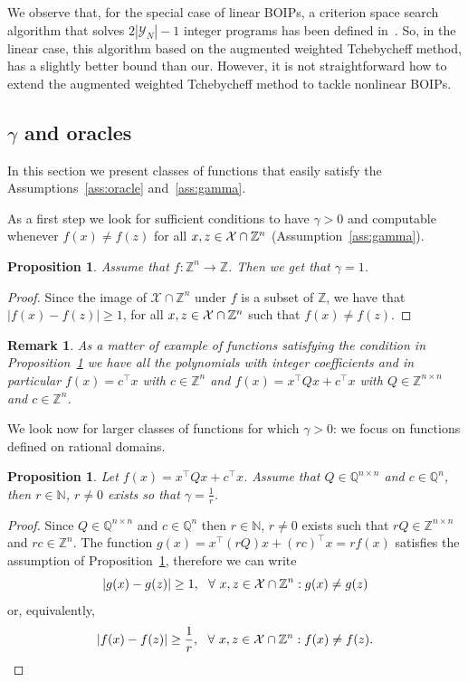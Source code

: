 \documentclass[preprint,12pt]{elsarticle}
\newtheorem{proposition}[theorem]{Proposition}
\newtheorem{remark}[theorem]{Remark}
\def\X{{\cal X}}
\def\Q{\mathbb{Q}}
\def\Z{\mathbb{Z}}
\def\N{\mathbb{N}}
\begin{document}
We observe that, for the special case of linear BOIPs, a criterion space search algorithm
that solves $2|\mathcal{Y}_N|-1$ integer programs has been defined in~\cite{ralphs2006improved}.
So, in the linear case, this algorithm based on the augmented weighted Tchebycheff method, has a slightly better bound than our.
However, it is not straightforward how to extend the augmented weighted Tchebycheff method to tackle nonlinear BOIPs.

\subsection{$\gamma$ and oracles}
In this section we present classes of functions that easily satisfy the Assumptions~\ref{ass:oracle} and~\ref{ass:gamma}.


As a first step we look for sufficient conditions to have $\gamma>0$ and computable whenever $f(x)\neq f(z)$ for all $x,z \in \X\cap \Z^n$ (Assumption~\ref{ass:gamma}).
\begin{proposition}\label{prop:suffcond}
Assume that $f:\Z^n\rightarrow \Z$. Then we get that $\gamma = 1$.
\end{proposition}
\begin{proof}
Since the image of $\mathcal{X}\cap \Z^n$ under $f$ is a subset of $\Z$, we have that $ |f(x) - f(z)| \ge 1$, for all $x,z \in \X\cap \Z^n$ such that $f(x) \neq f(z)$.
\end{proof}

\begin{remark}As a matter of example of functions satisfying the condition in Proposition~\ref{prop:suffcond} we have all the polynomials with integer coefficients and in particular  $f(x) = c^\top x$ with  $c\in \Z^n$ and $f(x) = x^\top Q x + c^\top x$ with $Q \in \Z^{n\times n}$ and $c \in \Z^n$.
\end{remark}
We look now for larger classes of functions for which $\gamma >0$: we focus on functions defined on rational domains.
\begin{proposition}\label{prop:condquad}
Let $f(x) = x^\top Q x + c^\top x $.
Assume that $Q \in \Q^{n\times n}$ and $c \in \Q^n$, then $r \in \N$, $r\neq 0$ exists so that $\gamma = \frac{1}{r}$.
\end{proposition}
\begin{proof}
Since $Q \in \Q^{n\times n}$ and $c \in \Q^n$ then $r \in \N$, $r\neq 0$ exists such that $rQ \in \Z^{n\times n}$ and $rc \in \Z^n$.
The function $g(x) = x^\top (rQ) x + (rc)^\top x = r f(x)$ satisfies the assumption of Proposition~\ref{prop:suffcond}, therefore we can write
\[
| g(x) - g(z) | \ge 1, \ \ \forall \ x,z \in \X \cap \Z^n: g(x) \neq g(z) \\
\]
or, equivalently,
\[
| f(x) - f(z) | \ge \frac{1}{r}, \ \ \forall \ x,z \in \X\cap \Z^n : f(x) \neq f(z).
\]
\end{proof}
\end{document}
